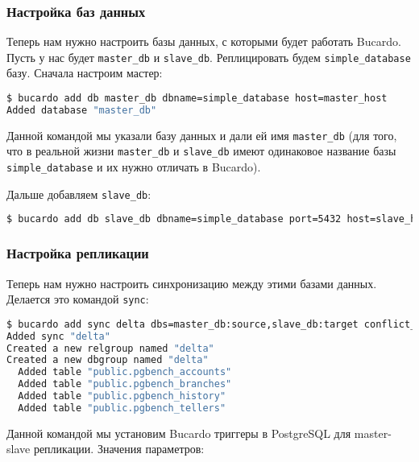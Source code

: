 \subsubsection{Настройка баз данных}

Теперь нам нужно настроить базы данных, с которыми будет работать Bucardo. Пусть у нас будет \lstinline!master_db! и \lstinline!slave_db!. Реплицировать будем \lstinline!simple_database! базу. Сначала настроим мастер:

\begin{lstlisting}[language=Bash,label=lst:bucardo7,caption=Настройка баз данных]
$ bucardo add db master_db dbname=simple_database host=master_host
Added database "master_db"
\end{lstlisting}

Данной командой мы указали базу данных и дали ей имя \lstinline!master_db! (для того, что в реальной жизни \lstinline!master_db! и \lstinline!slave_db!
имеют одинаковое название базы \lstinline!simple_database! и их нужно отличать в Bucardo).

Дальше добавляем \lstinline!slave_db!:

\begin{lstlisting}[language=Bash,label=lst:bucardo8,caption=Настройка баз данных]
$ bucardo add db slave_db dbname=simple_database port=5432 host=slave_host
\end{lstlisting}

\subsubsection{Настройка репликации}

Теперь нам нужно настроить синхронизацию между этими базами данных. Делается это командой \lstinline!sync!:

\begin{lstlisting}[language=Bash,label=lst:bucardo9,caption=Настройка репликации]
$ bucardo add sync delta dbs=master_db:source,slave_db:target conflict_strategy=bucardo_latest tables=all
Added sync "delta"
Created a new relgroup named "delta"
Created a new dbgroup named "delta"
  Added table "public.pgbench_accounts"
  Added table "public.pgbench_branches"
  Added table "public.pgbench_history"
  Added table "public.pgbench_tellers"
\end{lstlisting}

Данной командой мы установим Bucardo триггеры в PostgreSQL для master-slave репликации. Значения параметров:

